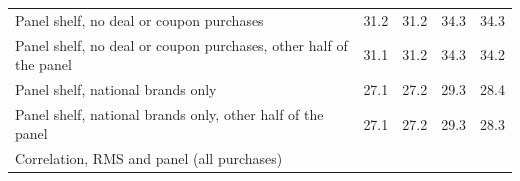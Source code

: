 \begin{tabular}{
    l
    S[table-format=2.2]
    S[table-format=2.2]
    S[table-format=2.2]
    S[table-format=2.2]
}
\quad Panel shelf, no deal or coupon purchases & 31.2 & 31.2 & 34.3 & 34.3 \\
\quad Panel shelf, no deal or coupon purchases, other half of the panel & 31.1 & 31.2 & 34.3 & 34.2 \\
\quad Panel shelf, national brands only & 27.1 & 27.2 & 29.3 & 28.4 \\
\quad Panel shelf, national brands only, other half of the panel & 27.1 & 27.2 & 29.3 & 28.3 \\
\quad Correlation, RMS and panel (all purchases) & {} & {} & {} & {} \\
\bottomrule
\end{tabular}
